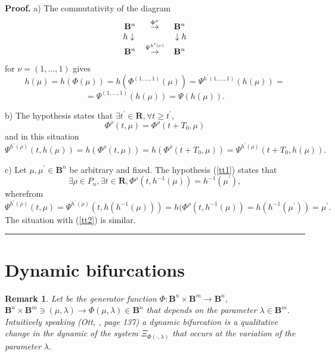 \documentclass[12pt]{article}\usepackage{amsmath}
\newtheorem{remark}[theorem]{Remark}
\newenvironment{proof}[1][Proof]{\textbf{#1.} }{\ \rule{0.5em}{0.5em}}
\begin{document}
\begin{proof}
a) The commutativity of the diagram\[\begin{array}
[c]{ccc}\mathbf{B}^{n} & \overset{\Phi^{\nu}}{\rightarrow} & \mathbf{B}^{n}\\
h\downarrow\; &  & \;\downarrow h\\
\mathbf{B}^{n} & \overset{\Psi^{h^{\prime}(\nu)}}{\rightarrow} &
\mathbf{B}^{n}\end{array}
\]
for $\nu=(1,...,1)$ gives\[
h(\mu)=h(\Phi(\mu))=h(\Phi^{(1,...,1)}(\mu))=\Psi^{h^{\prime}(1,...,1)}(h(\mu))=
\]\[
=\Psi^{(1,...,1)}(h(\mu))=\Psi(h(\mu)).
\]


b) The hypothesis states that $\exists t^{\prime}\in\mathbf{R},\forall t\geq
t^{\prime},$\[
\Phi^{\rho}(t,\mu)=\Phi^{\rho}(t+T_{0},\mu)
\]
and in this situation\[
\Psi^{h^{\prime}(\rho)}(t,h(\mu))=h(\Phi^{\rho}(t,\mu))=h(\Phi^{\rho}(t+T_{0},\mu))=\Psi^{h^{\prime}(\rho)}(t+T_{0},h(\mu)).
\]


c) Let $\mu,\mu^{\prime}\in\mathbf{B}^{n}$ be arbitrary and fixed. The
hypothesis (\ref{tt1}) states that\[
\exists\rho\in P_{n},\exists t\in\mathbf{R},\Phi^{\rho}(t,h^{-1}(\mu
))=h^{-1}(\mu^{\prime}),
\]
wherefrom\[
\Psi^{h^{\prime}(\rho)}(t,\mu)=\Psi^{h^{\prime}(\rho)}(t,h(h^{-1}(\mu)))=h(\Phi^{\rho}(t,h^{-1}(\mu))=h(h^{-1}(\mu^{\prime}))=\mu^{\prime}.
\]
The situation with (\ref{tt2}) is similar.
\end{proof}

\section{Dynamic bifurcations}

\begin{remark}
Let be the generator function $\Phi:\mathbf{B}^{n}\times\mathbf{B}^{m}\rightarrow\mathbf{B}^{n},$ $\mathbf{B}^{n}\times\mathbf{B}^{m}\ni
(\mu,\lambda)\rightarrow\Phi(\mu,\lambda)\in\mathbf{B}^{n}$ that depends on
the parameter $\lambda\in\mathbf{B}^{m}$. Intuitively speaking (Ott,
\cite{bib3}, page 137) a dynamic bifurcation is a qualitative change in the
dynamic of the system $\Xi_{\Phi(\cdot,\lambda)}$ that occurs at the variation
of the parameter $\lambda$.
\end{remark}
\end{document}
